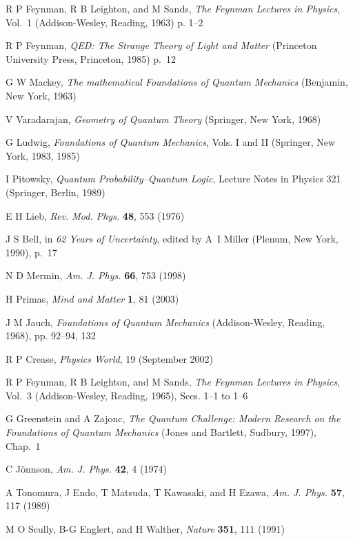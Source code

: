 \documentclass[12pt]{article}
\begin{document}
\pagebreak
\begin{thebibliography}{00}

R P Feynman, R B Leighton, and M Sands, \textit{The Feynman Lectures in Physics}, Vol.~1 (Addison-Wesley, Reading, 1963) p. 1--2

R P Feynman, \textit{QED: The Strange Theory of Light and Matter} (Princeton University Press, Princeton, 1985) p.~12

G W Mackey, \textit{The mathematical Foundations of Quantum Mechanics} (Benjamin, New York, 1963)

V Varadarajan, \textit{Geometry of Quantum Theory} (Springer, New York, 1968)

G Ludwig, \textit{Foundations of Quantum Mechanics}, Vols. I and II (Springer, New York, 1983, 1985)

I Pitowsky, \textit{Quantum Probability--Quantum Logic}, Lecture Notes in Physics 321 (Springer, Berlin, 1989)

E H Lieb, \textit{Rev. Mod. Phys.} \textbf{48}, 553 (1976)

J S Bell, in \textit{62 Years of Uncertainty}, edited by A~I Miller (Plenum, New York, 1990), p.~17

N D Mermin, \textit{Am. J. Phys.} \textbf{66}, 753 (1998)

H Primas, \textit{Mind and Matter} \textbf{1}, 81 (2003)

J M Jauch, \textit{Foundations of Quantum Mechanics} (Addison-Wesley, Reading, 1968), pp. 92--94, 132
 
R P Crease, \textit{Physics World}, 19 (September 2002)

R P Feynman, R B Leighton, and M Sands, \textit{The Feynman Lectures in Physics}, Vol.~3 (Addison-Wesley, Reading, 1965), Secs. 1--1 to 1--6

G Greenstein and A Zajonc, \textit{The Quantum Challenge: Modern Research on the Foundations of Quantum Mechanics} (Jones and Bartlett, Sudbury, 1997), Chap.~1

C J\"onnson, \textit{Am. J. Phys.} \textbf{42}, 4 (1974)

A Tonomura, J Endo, T Matsuda, T Kawasaki, and H Ezawa, \textit{Am. J. Phys.} \textbf{57}, 117 (1989)

M O Scully, B-G Englert, and H Walther, \textit{Nature} \textbf{ 351}, 111 (1991)


\end{thebibliography}
\end{document}
